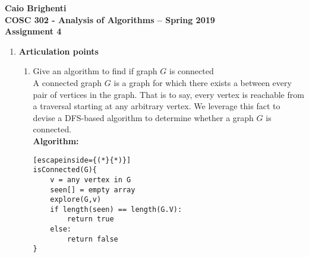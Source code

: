 \documentclass{article}
\begin{document}
\noindent \textbf{Caio Brighenti }\\
\noindent \textbf{COSC 302 - Analysis of Algorithms -- Spring 2019}\\%
\noindent \textbf{Assignment 4}\vspace{1em}\\
\begin{enumerate}
	\item \textbf{Articulation points}
	\begin{enumerate}
		\item Give an algorithm to find if graph $G$ is connected
		\\ A connected graph $G$ is a graph for which there exists a between every pair of vertices in the graph. That is to say, every vertex is reachable from a traversal starting at any arbitrary vertex. We leverage this fact to devise a DFS-based algorithm to determine whether a graph $G$ is connected.
		\\ \textbf{Algorithm:}
		\begin{lstlisting}[escapeinside={(*}{*)}]
isConnected(G){
	v = any vertex in G
	seen[] = empty array
	explore(G,v)
	if length(seen) == length(G.V):
		return true
	else:
		return false			
}


\end{lstlisting}
\end{enumerate}
\end{enumerate}
\end{document}
